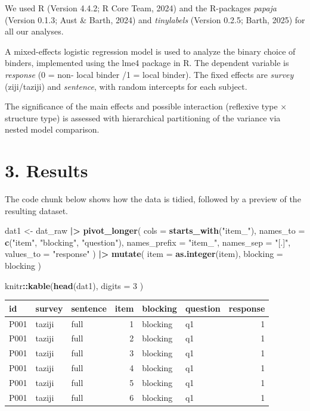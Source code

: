 \documentclass[
  man]{apa6}
\newenvironment{Shaded}{\begin{snugshade}}{\end{snugshade}}
\newcommand{\AttributeTok}[1]{\textcolor[rgb]{0.13,0.29,0.53}{#1}}
\newcommand{\DecValTok}[1]{\textcolor[rgb]{0.00,0.00,0.81}{#1}}
\newcommand{\FunctionTok}[1]{\textcolor[rgb]{0.13,0.29,0.53}{\textbf{#1}}}
\newcommand{\NormalTok}[1]{#1}
\newcommand{\OtherTok}[1]{\textcolor[rgb]{0.56,0.35,0.01}{#1}}
\newcommand{\SpecialCharTok}[1]{\textcolor[rgb]{0.81,0.36,0.00}{\textbf{#1}}}
\newcommand{\StringTok}[1]{\textcolor[rgb]{0.31,0.60,0.02}{#1}}
\begin{document}
We used R (Version 4.4.2; R Core Team, 2024) and the R-packages \emph{papaja} (Version 0.1.3; Aust \& Barth, 2024) and \emph{tinylabels} (Version 0.2.5; Barth, 2025) for all our analyses.

A mixed-effects logistic regression model is used to analyze the binary choice of binders, implemented using the lme4 package in R. The dependent variable is \emph{response} (0 = non- local binder /1 = local binder). The fixed effects are \emph{survey} (ziji/taziji) and \emph{sentence}, with random intercepts for each subject.

The significance of the main effects and possible interaction (reflexive type × structure type) is assessed with hierarchical partitioning of the variance via nested model comparison.

\section{3. Results}\label{results}

The code chunk below shows how the data is tidied, followed by a preview of the resulting dataset.

\begin{Shaded}
\begin{Highlighting}[]
\NormalTok{dat1 }\OtherTok{\textless{}{-}}\NormalTok{ dat\_raw }\SpecialCharTok{|\textgreater{}} 
  \FunctionTok{pivot\_longer}\NormalTok{(}
    \AttributeTok{cols      =} \FunctionTok{starts\_with}\NormalTok{(}\StringTok{"item\_"}\NormalTok{),}
    \AttributeTok{names\_to  =} \FunctionTok{c}\NormalTok{(}\StringTok{"item"}\NormalTok{, }\StringTok{"blocking"}\NormalTok{, }\StringTok{"question"}\NormalTok{), }
    \AttributeTok{names\_prefix =} \StringTok{"item\_"}\NormalTok{,}
    \AttributeTok{names\_sep   =} \StringTok{"[.]"}\NormalTok{,}
    \AttributeTok{values\_to =} \StringTok{"response"}
\NormalTok{  ) }\SpecialCharTok{|\textgreater{}} 
  \FunctionTok{mutate}\NormalTok{(}
    \AttributeTok{item =} \FunctionTok{as.integer}\NormalTok{(item),}
    \AttributeTok{blocking =}\NormalTok{ blocking}
\NormalTok{  )}

\NormalTok{  knitr}\SpecialCharTok{::}\FunctionTok{kable}\NormalTok{(}\FunctionTok{head}\NormalTok{(dat1), }\AttributeTok{digits =} \DecValTok{3}\NormalTok{ )}
\end{Highlighting}
\end{Shaded}

\begin{tabular}{l|l|l|r|l|l|r}
\hline
id & survey & sentence & item & blocking & question & response\\
\hline
P001 & taziji & full & 1 & blocking & q1 & 1\\
\hline
P001 & taziji & full & 2 & blocking & q1 & 1\\
\hline
P001 & taziji & full & 3 & blocking & q1 & 1\\
\hline
P001 & taziji & full & 4 & blocking & q1 & 1\\
\hline
P001 & taziji & full & 5 & blocking & q1 & 1\\
\hline
P001 & taziji & full & 6 & blocking & q1 & 1\\
\hline
\end{tabular}
\end{document}
